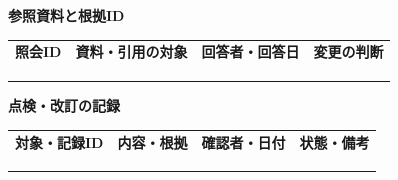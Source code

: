 \documentclass[11pt,a4paper]{article}
\begin{document}
\par{}\noindent\textbf{参照資料と根拠ID}\par\vspace{1mm}
{\fontsize{8.5}{13}\selectfont
\begin{tabularx}{\linewidth}{@{}XXXX@{}}
\textbf{照会ID} & \textbf{資料・引用の対象} & \textbf{回答者・回答日} & \textbf{変更の判断}\\[2mm]
\strut & \strut & \strut & \strut\\[5mm]
\strut & \strut & \strut & \strut\\[5mm]
\strut & \strut & \strut & \strut\\[5mm]
\end{tabularx}
}\vspace{2mm}\par
{}
\par{}\noindent\textbf{点検・改訂の記録}\par\vspace{1mm}
{\fontsize{8.5}{13}\selectfont
\begin{tabularx}{\linewidth}{@{}XXXX@{}}
\textbf{対象・記録ID} & \textbf{内容・根拠} & \textbf{確認者・日付} & \textbf{状態・備考}\\[2mm]
\strut & \strut & \strut & \strut\\[5mm]
\strut & \strut & \strut & \strut\\[5mm]
\strut & \strut & \strut & \strut\\[5mm]
\end{tabularx}
}\vspace{2mm}\par
\end{document}
